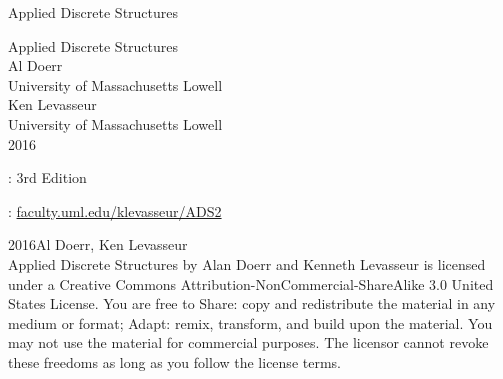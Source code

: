 \documentclass[oneside,10pt,]{book}
\newcommand{\titlepagefont}{\relax}
\begin{document}
\frontmatter
\thispagestyle{empty}
{\titlepagefont\centering
\vspace*{0.28\textheight}
{\Huge Applied Discrete Structures}\\}
\clearpage
\thispagestyle{empty}
\null%
\clearpage
\thispagestyle{empty}
{\titlepagefont\centering
\vspace*{0.14\textheight}
{\Huge Applied Discrete Structures}\\[3\baselineskip]
{\Large Al Doerr}\\[0.5\baselineskip]
{\Large University of Massachusetts Lowell}\\[3\baselineskip]
{\Large Ken Levasseur}\\[0.5\baselineskip]
{\Large University of Massachusetts Lowell}\\[3\baselineskip]
{\Large 2016}\\}
\clearpage
\thispagestyle{empty}
\hypertarget{g:colophon:idm352001309120}{}
: 3rd Edition\par\medskip
{}: \href{http:\slash{}\slash{}faculty.uml.edu\slash{}klevasseur\slash{}ADS2}{faculty.uml.edu\slash{}klevasseur\slash{}ADS2}\par\medskip
\noindent\textcopyright{}2016\quad{}Al Doerr, Ken Levasseur\\[0.5\baselineskip]
Applied Discrete Structures by Alan Doerr and Kenneth Levasseur is licensed under a Creative Commons Attribution-NonCommercial-ShareAlike 3.0 United States License. You are free to Share: copy and redistribute the material in any medium or format; Adapt: remix, transform, and build upon the material. You may not use the material for commercial purposes.  The licensor cannot revoke these freedoms as long as you follow the license terms.\par\medskip
{}
\null\clearpage
%
%
\typeout{************************************************}
\typeout{************************************************}
%
\end{document}
